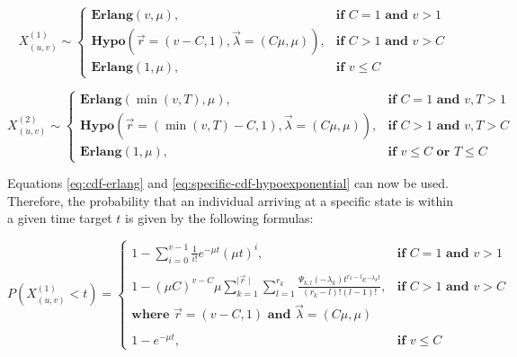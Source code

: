 \begin{equation}
    X_{(u,v)}^{(1)} \sim 
    \begin{cases}
        \textbf{Erlang}(v, \mu), & \textbf{if } C = 1 \textbf{ and } v>1 \\
        \textbf{Hypo}\left(\vec{r}=(v - C, 1), \vec{\lambda}=(C \mu, \mu)\right), 
            & \textbf{if } C > 1 \textbf{ and } v>C \\
        \textbf{Erlang}(1, \mu), & \textbf{if } v \leq C
    \end{cases}
\end{equation}

\begin{equation}
    X_{(u,v)}^{(2)} \sim 
    \begin{cases}
        \textbf{Erlang}(\min(v, T), \mu), & \textbf{if } C = 1
            \textbf{ and } v, T > 1 \\
        \textbf{Hypo}\left(\vec{r}=(\min(v, T) - C, 1), \vec{\lambda}=(C \mu, \mu)\right), & 
            \textbf{if } C > 1 \textbf{ and } v, T  > C \\
        \textbf{Erlang}(1, \mu), & \textbf{if } v \leq C \textbf{ or } T \leq C
    \end{cases}
\end{equation}


Equations \ref{eq:cdf-erlang} and \ref{eq:specific-cdf-hypoexponential} can now
be used.
Therefore, the probability that an individual arriving at a specific state is 
within a given time target \(t\) is given by the following formulas:


\begin{equation}
    P(X_{(u,v)}^{(1)} < t) = 
    \begin{cases}
        1 - \sum_{i=0}^{v-1} \frac{1}{i!} e^{-\mu t} (\mu t)^i, 
            & \textbf{if } C = 1 \textbf{ and } v>1 \\
        & \\
        1 - (\mu C)^{v-C} \mu  
            \sum_{k=1}^{\mid \vec{r} \mid} \sum_{l=1}^{r_k}
            \frac{\Psi_{k,l}(-\lambda_k)t^{r_k - l} 
            e^{-\lambda_k t}}{(r_k - l)! (l - 1)!},
            & \textbf{if } C > 1 \textbf{ and } v > C \\
        \textbf{where } \vec{r}=(v - C, 1) \textbf{ and } 
            \vec{\lambda}=(C \mu, \mu) & \\
        & \\
        1 - e^{-\mu t},  & \textbf{if } v \leq C
    \end{cases}
\end{equation}


